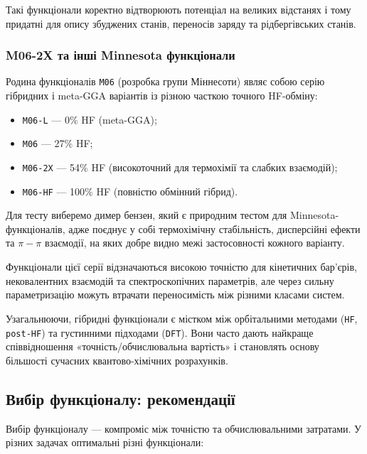 Такі функціонали коректно відтворюють потенціал на великих відстанях і тому придатні для опису збуджених станів, переносів заряду та рідбергівських станів.

\subsubsection{M06-2X та інші Minnesota функціонали}

Родина функціоналів \texttt{M06} (розробка групи Міннесоти) являє собою серію гібридних і meta-GGA варіантів із різною часткою точного HF-обміну:

\begin{itemize}
    \item \texttt{M06-L} — 0\% HF (meta-GGA);
    \item \texttt{M06} — 27\% HF;
    \item \texttt{M06-2X} — 54\% HF (високоточний для термохімії та слабких взаємодій);
    \item \texttt{M06-HF} — 100\% HF (повністю обмінний гібрид).
\end{itemize}

Для тесту  виберемо  димер бензен, який є природним тестом для Minnesota-функціоналів,
адже поєднує у собі термохімічну стабільність, дисперсійні ефекти та $\pi-\pi$ взаємодії,
на яких добре видно межі застосовності кожного варіанту.

Функціонали цієї серії відзначаються високою точністю для кінетичних бар’єрів, нековалентних взаємодій та спектроскопічних параметрів, але через сильну параметризацію можуть втрачати переносимість між різними класами систем.

\bigskip
Узагальнюючи, гібридні функціонали є містком між орбітальними методами (\texttt{HF}, \texttt{post-HF}) та густинними підходами (\texttt{DFT}).
Вони часто дають найкраще співвідношення «точність/обчислювальна вартість» і становлять основу більшості сучасних квантово-хімічних розрахунків.


\subsection{Вибір функціоналу: рекомендації}

Вибір функціоналу --- компроміс між точністю та обчислювальними затратами.
У різних задачах оптимальні різні функціонали:

